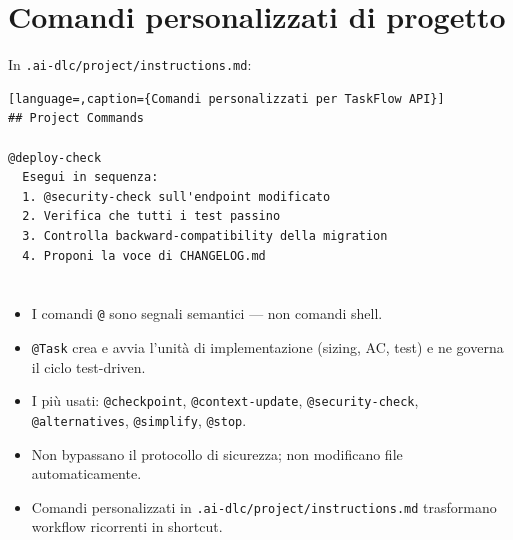 \section{Comandi personalizzati di progetto}
\label{sec:13-personalizzati}

In \texttt{.ai-dlc/project/instructions.md}:

\begin{lstlisting}[language=,caption={Comandi personalizzati per TaskFlow API}]
## Project Commands

@deploy-check
  Esegui in sequenza:
  1. @security-check sull'endpoint modificato
  2. Verifica che tutti i test passino
  3. Controlla backward-compatibility della migration
  4. Proponi la voce di CHANGELOG.md
\end{lstlisting}

\section*{\LabelSummary}

\begin{itemize}
  \item I comandi \texttt{@} sono segnali semantici --- non comandi shell.
  \item \texttt{@Task} crea e avvia l'unità di implementazione (sizing, AC, test) e ne governa il ciclo test-driven.
  \item I più usati: \texttt{@checkpoint}, \texttt{@context-update}, \texttt{@security-check}, \texttt{@alternatives}, \texttt{@simplify}, \texttt{@stop}.
  \item Non bypassano il protocollo di sicurezza; non modificano file automaticamente.
  \item Comandi personalizzati in \texttt{.ai-dlc/project/instructions.md} trasformano workflow ricorrenti in shortcut.
\end{itemize}
